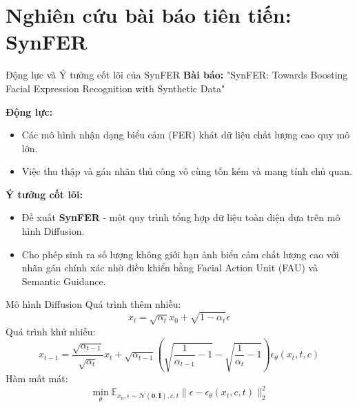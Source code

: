\section{Nghiên cứu bài báo tiên tiến: SynFER}
\begin{frame}{Động lực và Ý tưởng cốt lõi của SynFER}
    \textbf{Bài báo:} "SynFER: Towards Boosting Facial Expression Recognition with Synthetic Data" \cite{he2025synfer}
    \vspace{0.3cm}

    \textbf{Động lực:}
    \begin{itemize}
        \item Các mô hình nhận dạng biểu cảm (FER) khát dữ liệu chất lượng cao quy mô lớn.
        \item Việc thu thập và gán nhãn thủ công vô cùng tốn kém và mang tính chủ quan.
    \end{itemize}
    \vspace{0.3cm}
    \textbf{Ý tưởng cốt lõi:}
    \begin{itemize}

        \item Đề xuất \textbf{SynFER} - một quy trình tổng hợp dữ liệu toàn diện dựa trên mô hình Diffusion.
        \item Cho phép sinh ra số lượng không giới hạn ảnh biểu cảm chất lượng cao với nhãn gán chính xác nhờ điều khiển bằng Facial Action Unit (FAU) và Semantic Guidance.
    \end{itemize}
\end{frame}

\begin{frame}{Mô hình Diffusion}
    Quá trình thêm nhiễu:
    \begin{equation}
        x_t = \sqrt{\alpha_t}x_0 + \sqrt{1-\alpha_t}\epsilon
    \end{equation}
    Quá trình khử nhiễu:
    \begin{equation}
        x_{t-1} = \frac{\sqrt{\alpha_{t-1}}}{\sqrt{\alpha_{t}}} x_t + \sqrt{\alpha_{t-1}} \left(\sqrt{\frac{1}{\alpha_{t-1}} - 1} - \sqrt{\frac{1}{\alpha_t} -1}\right) \epsilon_{\theta}(x_t, t, c)
    \end{equation}
    Hàm mất mát:
    \begin{equation}
        \min_{\theta} \mathbb{E}_{x_0,\epsilon\sim\mathcal{N}(\mathbf{0},\mathbf{I}),c,t}\|\epsilon-\epsilon_\theta(x_t,c,t)\|_2^2
    \end{equation}
\end{frame}

